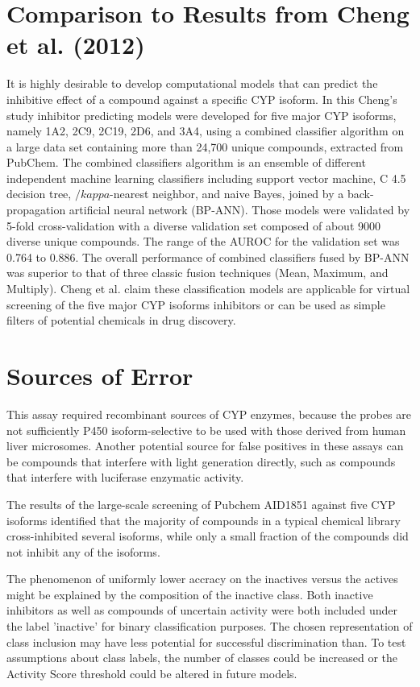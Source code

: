 \section{Comparison to Results from Cheng et al. (2012)}
It is highly desirable to develop computational models that can predict the inhibitive effect of a compound against a specific CYP isoform. In this Cheng's study inhibitor predicting models were developed for five major CYP isoforms, namely 1A2, 2C9, 2C19, 2D6, and 3A4, using a combined classifier algorithm on a large data set containing more than 24,700 unique compounds, extracted from PubChem. The combined classifiers algorithm is an ensemble of different independent machine learning classifiers including support vector machine, C 4.5 decision tree, $/kappa$-nearest neighbor, and naive Bayes, joined by a back-propagation artificial neural network (BP-ANN). Those models were validated by 5-fold cross-validation with a diverse validation set composed of about 9000 diverse unique compounds. The range of the AUROC for the validation set was 0.764 to 0.886. The overall performance of combined classifiers fused by BP-ANN was superior to that of three classic fusion techniques (Mean, Maximum, and Multiply). Cheng et al. claim these classification models are applicable for virtual screening of the five major CYP isoforms inhibitors or can be used as simple filters of potential chemicals in drug discovery. \cite{Cheng2011}


\section{Sources of Error}
This assay required recombinant sources of CYP enzymes, because the probes are not sufficiently P450 isoform-selective to be used with those derived from human liver microsomes. Another potential source for false positives in these assays can be compounds that interfere with light generation directly, such as compounds that interfere with luciferase enzymatic activity. \cite{Zlokarnik2005}

The results of the large-scale screening of Pubchem AID1851 against five CYP isoforms identified that the majority of compounds in a typical chemical library cross-inhibited several isoforms, while only a small fraction of the compounds did not inhibit any of the isoforms. \cite{Veith2009}

The phenomenon of uniformly lower accracy on the inactives versus the actives might be explained by the composition of the inactive class. Both inactive inhibitors as well as compounds of uncertain activity were both included under the label 'inactive' for binary classification purposes. The chosen representation of class inclusion may have less potential for successful discrimination than. To test assumptions about class labels, the number of classes could be increased or the Activity Score threshold could be altered in future models.


